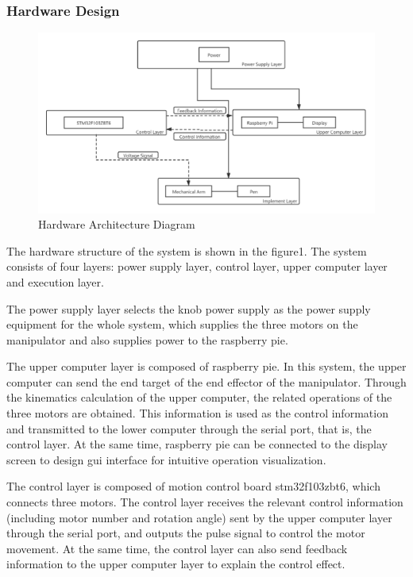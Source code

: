 \documentclass{hci}
\begin{document}
\subsubsection{Hardware Design}
\begin{figure}[htbp]
	\centering
	\includegraphics[width=1\linewidth]{figures/HA}
	\caption{Hardware Architecture Diagram}
	\label{fig:HA}
\end{figure}
The hardware structure of the system is shown in the figure1. The system consists of four layers: power supply layer, control layer, upper computer layer and execution layer.

The power supply layer selects the knob power supply as the power supply equipment for the whole system, which supplies the three motors on the manipulator and also supplies power to the raspberry pie.

The upper computer layer is composed of raspberry pie. In this system, the upper computer can send the end target of the end effector of the manipulator. Through the kinematics calculation of the upper computer, the related operations of the three motors are obtained. This information is used as the control information and transmitted to the lower computer through the serial port, that is, the control layer. At the same time, raspberry pie can be connected to the display screen to design gui interface for intuitive operation visualization.

The control layer is composed of motion control board stm32f103zbt6, which connects three motors. The control layer receives the relevant control information (including motor number and rotation angle) sent by the upper computer layer through the serial port, and outputs the pulse signal to control the motor movement. At the same time, the control layer can also send feedback information to the upper computer layer to explain the control effect.
\end{document}
